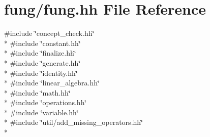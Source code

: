 \hypertarget{fung_8hh}{\section{fung/fung.hh File Reference}
\label{fung_8hh}
}
{\ttfamily \#include \char`\"{}concept\-\_\-check.\-hh\char`\"{}}\\*
{\ttfamily \#include \char`\"{}constant.\-hh\char`\"{}}\\*
{\ttfamily \#include \char`\"{}finalize.\-hh\char`\"{}}\\*
{\ttfamily \#include \char`\"{}generate.\-hh\char`\"{}}\\*
{\ttfamily \#include \char`\"{}identity.\-hh\char`\"{}}\\*
{\ttfamily \#include \char`\"{}linear\-\_\-algebra.\-hh\char`\"{}}\\*
{\ttfamily \#include \char`\"{}math.\-hh\char`\"{}}\\*
{\ttfamily \#include \char`\"{}operations.\-hh\char`\"{}}\\*
{\ttfamily \#include \char`\"{}variable.\-hh\char`\"{}}\\*
{\ttfamily \#include \char`\"{}util/add\-\_\-missing\-\_\-operators.\-hh\char`\"{}}\\*

